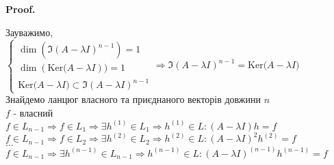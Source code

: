 \documentclass[a4paper, 10pt]{article}
\makeatletter
\def\qed{$\blacksquare$}
\def\ker#1{\textrm{Ker} {#1}}
\theoremstyle{theoremdd}
\theoremstyle{theoremdd}
\theoremstyle{theoremdd}
\theoremstyle{theoremdd}
\theoremstyle{theoremdd}
\theoremstyle{theoremdd}
\theoremstyle{theoremdd}
\theoremstyle{theoremdd}
\renewenvironment{proof}[1][Proof.\\]{\par
\pushQED{\hfill \qed}%
\normalfont \topsep6\p@\@plus6\p@\relax
\trivlist
\item\relax
{\bfseries
#1\@addpunct{.}}\hspace\labelsep\ignorespaces
}{%
\popQED\endtrivlist\@endpefalse
}
\makeatother
\begin{document}
\begin{proof}
Зауважимо,\\
$\begin{cases}
\dim (\Im(A-\lambda I)^{n-1}) = 1\\
\dim (\ker (A-\lambda I)) = 1\\
\ker (A-\lambda I) \subset \Im(A-\lambda I)^{n-1}
\end{cases} \Rightarrow \Im(A-\lambda I)^{n-1} = \ker(A-\lambda I)
$\\
Знайдемо ланцюг власного та приєднаного векторів довжини $n$\\
$f$ - власний\\
$f \in L_{n-1} \Rightarrow f \in L_1 \Rightarrow \exists h^{(1)} \in L_1 \Rightarrow h^{(1)} \in L: (A-\lambda I)h = f$\\
$f \in L_{n-1} \Rightarrow f \in L_2 \Rightarrow \exists h^{(2)} \in L_2 \Rightarrow h^{(2)} \in L: (A-\lambda I)^2 h^{(2)} = f$\\
$\dots$\\
$f \in L_{n-1} \Rightarrow \exists h^{(n-1)} \in L_{n-1} \Rightarrow h^{(n-1)} \in L: (A-\lambda I)^{(n-1)}h^{(n-1)} = f$
\end{proof}
\end{document}
